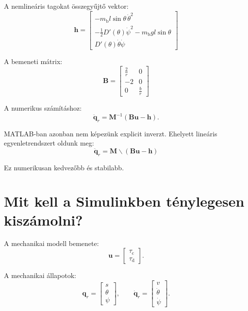 \documentclass[12pt,a4paper]{article}
\newcommand{\mbody}{m_{\mathrm{b}}}
\newcommand{\tauc}{\tau_{\mathrm{c}}}
\newcommand{\taud}{\tau_{\mathrm{d}}}
\begin{document}
	A nemlineáris tagokat összegyűjtő vektor:
	\begin{equation}
		\boxed{
			\bm h=
			\begin{bmatrix}
				-\mbody l\sin\theta\,\dot\theta^2\\
				-\frac{1}{2}D'(\theta)\dot\psi^2-\mbody g l\sin\theta\\
				D'(\theta)\dot\theta\dot\psi
			\end{bmatrix}
		}
	\end{equation}
	
	A bemeneti mátrix:
	\begin{equation}
		\boxed{
			\bm B=
			\begin{bmatrix}
				\frac{2}{r} & 0\\
				-2 & 0\\
				0 & \frac{b}{r}
			\end{bmatrix}
		}
	\end{equation}
	
	A numerikus számításhoz:
	\begin{equation}
		\ddot{\bm q}_r=
		\bm M^{-1}
		\left(
		\bm B\bm u-\bm h
		\right).
	\end{equation}
	
	MATLAB-ban azonban nem képezünk explicit inverzt. Ehelyett lineáris egyenletrendszert oldunk meg:
	\begin{equation}
		\boxed{
			\ddot{\bm q}_r
			=\bm M\backslash(\bm B\bm u-\bm h)
		}
	\end{equation}
	
	Ez numerikusan kedvezőbb és stabilabb.
	
	\section{Mit kell a Simulinkben ténylegesen kiszámolni?}
	
	A mechanikai modell bemenete:
	\begin{equation}
		\bm u=
		\begin{bmatrix}
			\tauc\\
			\taud
		\end{bmatrix}.
	\end{equation}
	
	A mechanikai állapotok:
	\begin{equation}
		\bm q_r=
		\begin{bmatrix}
			s\\
			\theta\\
			\psi
		\end{bmatrix},
		\qquad
		\dot{\bm q}_r=
		\begin{bmatrix}
			v\\
			\dot\theta\\
			\dot\psi
		\end{bmatrix}.
	\end{equation}
	
\end{document}
